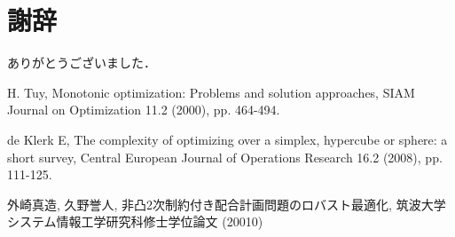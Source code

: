 \documentclass[a4paper,11pt]{jreport}
\begin{document}
\chapter*{謝辞}

ありがとうございました．\par

\newpage

\renewcommand{\bibname}{参考文献}

\begin{thebibliography}{1}

H. Tuy,
\newblock Monotonic optimization: Problems and solution approaches,
\newblock SIAM Journal on Optimization 11.2 (2000), pp. 464-494.

de Klerk E,
\newblock The complexity of optimizing over a simplex, hypercube or sphere: a short survey,
\newblock Central European Journal of Operations Research 16.2 (2008), pp. 111-125.

外崎真造, 久野誉人,
\newblock 非凸2次制約付き配合計画問題のロバスト最適化,
\newblock 筑波大学システム情報工学研究科修士学位論文 (20010)
\end{thebibliography}
\end{document}
